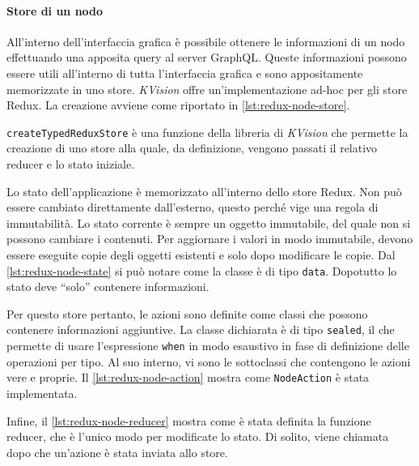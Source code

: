 \paragraph{Store di un nodo}
All'interno dell'interfaccia grafica è possibile ottenere le informazioni di un nodo effettuando una apposita query al server GraphQL. Queste informazioni possono essere utili all'interno di tutta l'interfaccia grafica e sono appositamente memorizzate in uno store. \textit{KVision} offre un'implementazione ad-hoc per gli store Redux. La creazione avviene come riportato in \cref{lst:redux-node-store}.

\texttt{createTypedReduxStore} è una funzione della libreria di \textit{KVision} che permette la creazione di uno store alla quale, da definizione, vengono passati il relativo reducer e lo stato iniziale.

Lo stato dell'applicazione è memorizzato all'interno dello store Redux. Non può essere cambiato direttamente dall'esterno, questo perché vige una regola di immutabilità. Lo stato corrente è sempre un oggetto immutabile, del quale non si possono cambiare i contenuti. Per aggiornare i valori in modo immutabile, devono essere eseguite copie degli oggetti esistenti e solo dopo modificare le copie. Dal \cref{lst:redux-node-state} si può notare come la classe è di tipo \texttt{data}. Dopotutto lo stato deve ``solo'' contenere informazioni.



Per questo store pertanto, le azioni sono definite come classi che possono contenere informazioni aggiuntive. La classe dichiarata è di tipo \texttt{sealed}, il che permette di usare l'espressione \texttt{when} in modo esaustivo in fase di definizione delle operazioni per tipo. Al suo interno, vi sono le sottoclassi che contengono le azioni vere e proprie. Il \cref{lst:redux-node-action} mostra come \texttt{NodeAction} è stata implementata.



Infine, il \cref{lst:redux-node-reducer} mostra come è stata definita la funzione reducer, che è l'unico modo per modificate lo stato. Di solito, viene chiamata dopo che un'azione è stata inviata allo store.

